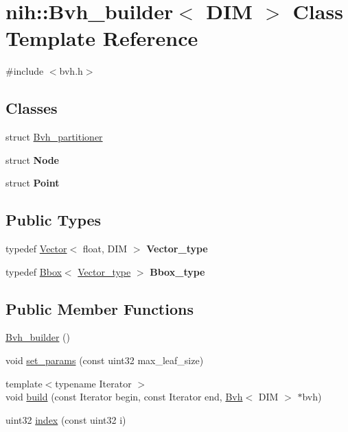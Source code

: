 \hypertarget{classnih_1_1_bvh__builder}{
\section{nih\-:\-:\-Bvh\-\_\-builder$<$ \-D\-I\-M $>$ \-Class \-Template \-Reference}
\label{classnih_1_1_bvh__builder}
}


{\ttfamily \#include $<$bvh.\-h$>$}

\subsection*{\-Classes}
\begin{DoxyCompactItemize}
\item 
struct \hyperlink{structnih_1_1_bvh__builder_1_1_bvh__partitioner}{\-Bvh\-\_\-partitioner}
\item 
struct {\bfseries \-Node}
\item 
struct {\bfseries \-Point}
\end{DoxyCompactItemize}
\subsection*{\-Public \-Types}
\begin{DoxyCompactItemize}
\item 
\hypertarget{classnih_1_1_bvh__builder_a74c08071203c4e009d9f803d2a5c7364}{
typedef \hyperlink{structnih_1_1_vector}{\-Vector}$<$ float, \-D\-I\-M $>$ {\bfseries \-Vector\-\_\-type}}
\label{classnih_1_1_bvh__builder_a74c08071203c4e009d9f803d2a5c7364}

\item 
\hypertarget{classnih_1_1_bvh__builder_a5fde43c1cd09a72e9ba3fda5cd9d95d6}{
typedef \hyperlink{structnih_1_1_bbox}{\-Bbox}$<$ \hyperlink{structnih_1_1_vector}{\-Vector\-\_\-type} $>$ {\bfseries \-Bbox\-\_\-type}}
\label{classnih_1_1_bvh__builder_a5fde43c1cd09a72e9ba3fda5cd9d95d6}

\end{DoxyCompactItemize}
\subsection*{\-Public \-Member \-Functions}
\begin{DoxyCompactItemize}
\item 
\hyperlink{classnih_1_1_bvh__builder_a87624ad195c1b8951139d239cf451dd1}{\-Bvh\-\_\-builder} ()
\item 
void \hyperlink{classnih_1_1_bvh__builder_ab712d0638e70ef9ab13c8a83467f858c}{set\-\_\-params} (const uint32 max\-\_\-leaf\-\_\-size)
\item 
{\footnotesize template$<$typename Iterator $>$ }\\void \hyperlink{classnih_1_1_bvh__builder_a7f5972c2af54b5e320b5db4f6f5f4a49}{build} (const \-Iterator begin, const \-Iterator end, \hyperlink{structnih_1_1_bvh}{\-Bvh}$<$ \-D\-I\-M $>$ $\ast$bvh)
\item 
uint32 \hyperlink{classnih_1_1_bvh__builder_a7de508b4aad9d948bef5ff164bcb0c3f}{index} (const uint32 i)
\end{DoxyCompactItemize}


